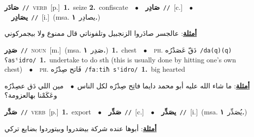 \documentclass[10pt,a4paper,twoside]{article} %
\begin{document}
\begin{multicols}{2}
{\setlength\topsep{0pt}\textbf{\foreignlanguage{arabic}{صَادَر}}\ {\color{gray}\texttt{//}\color{black}}\ \textsc{verb}\ [p.]\ \textbf{1.}~seize  \textbf{2.}~confiscate\ \ $\bullet$\ \ \setlength\topsep{0pt}\textbf{\foreignlanguage{arabic}{صَادِر}}\ {\color{gray}\texttt{//}\color{black}}\ [c.]\ \ $\bullet$\ \ \setlength\topsep{0pt}\textbf{\foreignlanguage{arabic}{يصَادِر}}\ {\color{gray}\texttt{//}\color{black}}\ [i.]\ \color{gray}(msa. \foreignlanguage{arabic}{يصادِر}~\foreignlanguage{arabic}{\textbf{١.}})\color{black}\  \begin{flushright}\color{gray}\foreignlanguage{arabic}{\textbf{\underline{\foreignlanguage{arabic}{أمثلة}}}: عالجسر صادَروا الزنجبيل وتلفوناتي قال ممنوع ولا بيجمركوني}\end{flushright}\color{black}} \vspace{2mm}

{\setlength\topsep{0pt}\textbf{\foreignlanguage{arabic}{صَدِر}}\ {\color{gray}\texttt{//}\color{black}}\ \textsc{noun}\ [m.]\ \color{gray}(msa. \foreignlanguage{arabic}{صَدِر}~\foreignlanguage{arabic}{\textbf{١.}})\color{black}\ \textbf{1.}~chest\ \ $\bullet$\ \ \textsc{ph.} \color{gray} \foreignlanguage{arabic}{دَقّ عَصَدْرُه}\color{black}\ {\color{gray}\texttt{/{\sffamily da(q)(q) ʕasˤidro}/}\color{black}}\ \textbf{1.}~undertake to do sth (this is usually done by hitting one's own chest)\ \ $\bullet$\ \ \textsc{ph.} \color{gray} \foreignlanguage{arabic}{فَاتح صِدْرُه}\color{black}\ {\color{gray}\texttt{/{\sffamily faːtiħ sˤidro}/}\color{black}}\ \textbf{1.}~big hearted\  \begin{flushright}\color{gray}\foreignlanguage{arabic}{\textbf{\underline{\foreignlanguage{arabic}{أمثلة}}}: ما شاء الله عليه أبو محمد دايما فاتِح صِدْرُه لكل الناس\ $\bullet$\ \  مين اللي دَق عصِدْرُه وعَكَمْنا بهالعزومة؟}\end{flushright}\color{black}} \vspace{2mm}

{\setlength\topsep{0pt}\textbf{\foreignlanguage{arabic}{صَدَّر}}\ {\color{gray}\texttt{//}\color{black}}\ \textsc{verb}\ [p.]\ \textbf{1.}~export\ \ $\bullet$\ \ \setlength\topsep{0pt}\textbf{\foreignlanguage{arabic}{صَدِّر}}\ {\color{gray}\texttt{//}\color{black}}\ [c.]\ \ $\bullet$\ \ \setlength\topsep{0pt}\textbf{\foreignlanguage{arabic}{يصَدِّر}}\ {\color{gray}\texttt{//}\color{black}}\ [i.]\ \color{gray}(msa. \foreignlanguage{arabic}{يُصَدِّر}~\foreignlanguage{arabic}{\textbf{١.}})\color{black}\  \begin{flushright}\color{gray}\foreignlanguage{arabic}{\textbf{\underline{\foreignlanguage{arabic}{أمثلة}}}: أبوها عنده شركة بيصَدروا وبيتوردوا بضايع تركي}\end{flushright}\color{black}} \vspace{2mm}


\end{multicols}
\end{document}

